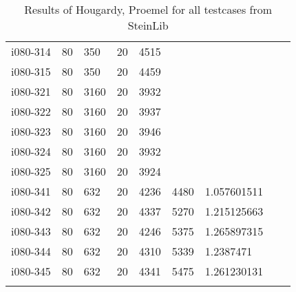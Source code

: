 \begin{appendices}
\begin{longtable}[htbp]{l l l l l l l l l}
 i080-314	&	80 	&	350 	&	20 	&	4515	&		&		&		\\
 i080-315	&	80 	&	350 	&	20 	&	4459	&		&		&		\\
\hline
 i080-321	&	80 	&	3160 	&	20 	&	3932	&		&		&		\\
 i080-322	&	80 	&	3160 	&	20 	&	3937	&		&		&		\\
 i080-323	&	80 	&	3160 	&	20 	&	3946	&		&		&		\\
 i080-324	&	80 	&	3160 	&	20 	&	3932	&		&		&		\\
 i080-325	&	80 	&	3160 	&	20 	&	3924	&		&		&		\\
\hline
 i080-341	&	80 	&	632 	&	20 	&	4236	&	4480	&	1.057601511	&		\\
 i080-342	&	80 	&	632 	&	20 	&	4337	&	5270	&	1.215125663	&		\\
 i080-343	&	80 	&	632 	&	20 	&	4246	&	5375	&	1.265897315	&		\\
 i080-344	&	80 	&	632 	&	20 	&	4310	&	5339	&	1.2387471	&		\\
 i080-345	&	80 	&	632 	&	20 	&	4341	&	5475	&	1.261230131	&		\\
\caption{Results of Hougardy, Proemel for all testcases from SteinLib \cite{Dui93}}\label{tab:HoPrFullResults} 	
\end{longtable}


\end{appendices}